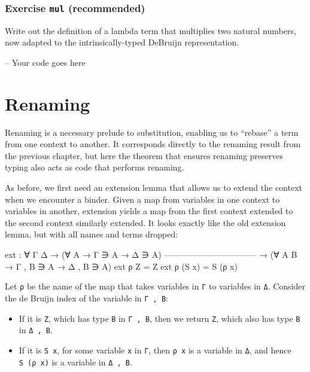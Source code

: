 \hypertarget{exercise-mul-recommended}{%
\subsubsection{\texorpdfstring{Exercise \texttt{mul}
(recommended)}{Exercise mul (recommended)}}\label{exercise-mul-recommended}}

Write out the definition of a lambda term that multiplies two natural
numbers, now adapted to the intrinsically-typed DeBruijn representation.

\begin{fence}
\begin{code}
-- Your code goes here
\end{code}
\end{fence}

\hypertarget{renaming}{%
\section{Renaming}\label{renaming}}

Renaming is a necessary prelude to substitution, enabling us to
``rebase'' a term from one context to another. It corresponds directly
to the renaming result from the previous chapter, but here the theorem
that ensures renaming preserves typing also acts as code that performs
renaming.

As before, we first need an extension lemma that allows us to extend the
context when we encounter a binder. Given a map from variables in one
context to variables in another, extension yields a map from the first
context extended to the second context similarly extended. It looks
exactly like the old extension lemma, but with all names and terms
dropped:

\begin{fence}
\begin{code}
ext : ∀ {Γ Δ}
  → (∀ {A} →       Γ ∋ A →     Δ ∋ A)
    ---------------------------------
  → (∀ {A B} → Γ , B ∋ A → Δ , B ∋ A)
ext ρ Z      =  Z
ext ρ (S x)  =  S (ρ x)
\end{code}
\end{fence}

Let \texttt{ρ} be the name of the map that takes variables in \texttt{Γ}
to variables in \texttt{Δ}. Consider the de Bruijn index of the variable
in \texttt{Γ\ ,\ B}:

\begin{itemize}
\item
  If it is \texttt{Z}, which has type \texttt{B} in \texttt{Γ\ ,\ B},
  then we return \texttt{Z}, which also has type \texttt{B} in
  \texttt{Δ\ ,\ B}.
\item
  If it is \texttt{S\ x}, for some variable \texttt{x} in \texttt{Γ},
  then \texttt{ρ\ x} is a variable in \texttt{Δ}, and hence
  \texttt{S\ (ρ\ x)} is a variable in \texttt{Δ\ ,\ B}.
\end{itemize}

